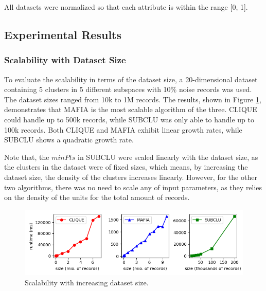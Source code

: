 All datasets were normalized so that each attribute is within the range [0, 1].

\subsection{Experimental Results}

\subsubsection{Scalability with Dataset Size}
To evaluate the scalability in terms of the dataset size, a 20-dimensional dataset containing 5 clusters in 5 different subspaces with 10\% noise records was used. The dataset sizes ranged from 10k to 1M records. The results, shown in Figure \ref{fig:dataset_size_vs_runtime}, demonstrates that MAFIA is the most scalable algorithm of the three. CLIQUE could handle up to 500k records, while SUBCLU was only able to handle up to 100k records. Both CLIQUE and MAFIA exhibit linear growth rates, while SUBCLU shows a quadratic growth rate.

Note that, the $minPts$ in SUBCLU were scaled linearly with the dataset size, as the clusters in the dataset were of fixed sizes, which means, by increasing the dataset size, the density of the clusters increases linearly. However, for the other two algorithms, there was no need to scale any of input parameters, as they relies on the density of the units for the total amount of records.
\begin{figure}[H]
    \vspace*{-0.6cm}
    \centering
    \includegraphics[scale=0.5]{figures/dataset_size_vs_runtime.png}
    \caption{Scalability with increasing dataset size.}
    \label{fig:dataset_size_vs_runtime}
    \vspace*{-0.6cm}
\end{figure}

